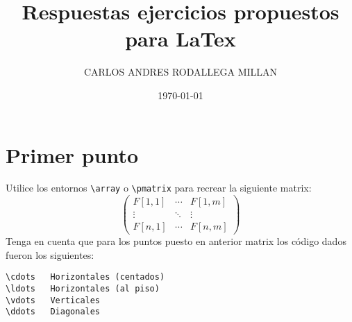 \documentclass[10pt,onecolumn,letterpaper]{article}
\title{Respuestas ejercicios propuestos para LaTex}
\author{CARLOS ANDRES RODALLEGA MILLAN}
\date{\today}
\begin{document}
\maketitle 
\section{Primer punto} 
Utilice los entornos \verb+\array+ o \verb+\pmatrix+ para recrear la siguiente matrix:
\begin{equation}
\begin{pmatrix}\nonumber
	F[1,1] & \cdots & F[1,m]\\
	\vdots & \ddots & \vdots\\
	F[n,1] & \cdots & F[n,m]
\end{pmatrix}
\end{equation}
Tenga en cuenta que para los puntos puesto en anterior matrix los código dados fueron los siguientes:
\begin{verbatim}
\cdots   Horizontales (centados)
\ldots	 Horizontales (al piso)
\vdots	 Verticales
\ddots	 Diagonales
\end{verbatim}
\end{document}
